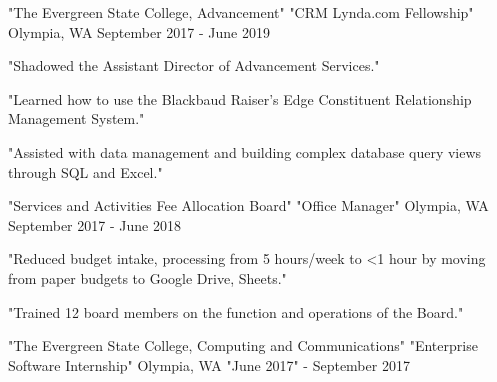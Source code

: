   \cventry
    { "The Evergreen State College, Advancement" } %
    { "CRM Lynda.com Fellowship" } %
    { Olympia, WA } %
    { September 2017 - June 2019 } %
    {
      \begin{cvitems} %
        \item { "Shadowed the Assistant Director of Advancement Services." }
        \item { "Learned how to use the Blackbaud Raiser's Edge Constituent Relationship Management System." }
        \item { "Assisted with data management and building complex database query views through SQL and Excel." }
      \end{cvitems}
    }
  \cventry
    { "Services and Activities Fee Allocation Board" } %
    { "Office Manager" } %
    { Olympia, WA } %
    { September 2017 - June 2018 } %
    {
      \begin{cvitems} %
        \item { "Reduced budget intake, processing from 5 hours/week to <1 hour by moving from paper budgets to Google Drive, Sheets." }
        \item { "Trained 12 board members on the function and operations of the Board." }
        \item {  }
      \end{cvitems}
    }
  \cventry
    { "The Evergreen State College, Computing and Communications" } %
    { "Enterprise Software Internship" } %
    { Olympia, WA } %
    { "June 2017" - September 2017 } %
    {
      \begin{cvitems} %
        \item {  }
        \item {  }
        \item {  }
      \end{cvitems}
    }
